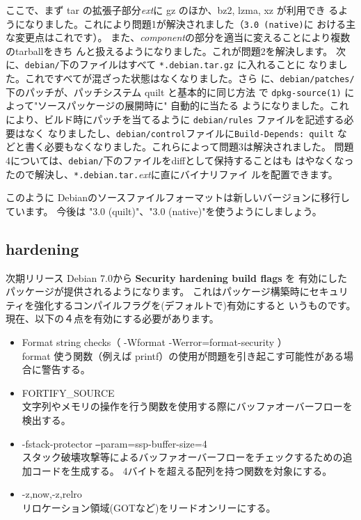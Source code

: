 \documentclass[mingoth,a4paper]{jsarticle}
\begin{document}
ここで、まず tar の拡張子部分\textit{ext}に gz のほか、bz2, lzma, xz が利用でき
るようになりました。これにより問題1が解決されました（\verb|3.0 (native)|に
おける主な変更点はこれです）。
また、\textit{component}の部分を適当に変えることにより複数のtarballをきち
んと扱えるようになりました。これが問題2を解決します。
次に、\verb|debian/|下のファイルはすべて \verb|*.debian.tar.gz| に入れることに
なりました。これですべてが混ざった状態はなくなりました。さら
に、\verb|debian/patches/| 下のパッチが、パッチシステム quilt と基本的に同じ方法
で \verb|dpkg-source(1)| によって"ソースパッケージの展開時に" 自動的に当たる
ようになりました。これにより、ビルド時にパッチを当てるように \verb|debian/rules| ファイルを記述する必要はなく
なりましたし、\verb|debian/control|ファイルに\verb|Build-Depends: quilt|
などと書く必要もなくなりました。これらによって問題3は解決されました。
問題4については、\verb|debian/|下のファイルをdiffとして保持することはも
はやなくなったので解決し、\verb|*.debian.tar.|\textit{ext}に直にバイナリファイ
ルを配置できます。

このように Debianのソースファイルフォーマットは新しいバージョンに移行しています。
今後は "3.0 (quilt)"、"3.0 (native)"を使うようにしましょう。

\subsection{hardening}
次期リリース Debian 7.0から {\bf Security hardening build flags} を
有効にしたパッケージが提供されるようになります。
これはパッケージ構築時にセキュリティを強化するコンパイルフラグを(デフォルトで)有効にすると
いうものです。現在、以下の４点を有効にする必要があります。

\begin{itemize}
  \item Format string checks（ -Wformat -Werror=format-security ）\\
  format 使う関数（例えば printf）の使用が問題を引き起こす可能性がある場合に警告する。
  \item FORTIFY\_SOURCE \\
  文字列やメモリの操作を行う関数を使用する際にバッファオーバーフローを検出する。
  \item -fstack-protector \texttt{--}param=ssp-buffer-size=4 \\
  スタック破壊攻撃等によるバッファオーバーフローをチェックするための追加コードを生成する。
  4バイトを超える配列を持つ関数を対象にする。
  \item -z,now,-z,relro \\
  リロケーション領域(GOTなど)をリードオンリーにする。
\end{itemize}
\end{document}
